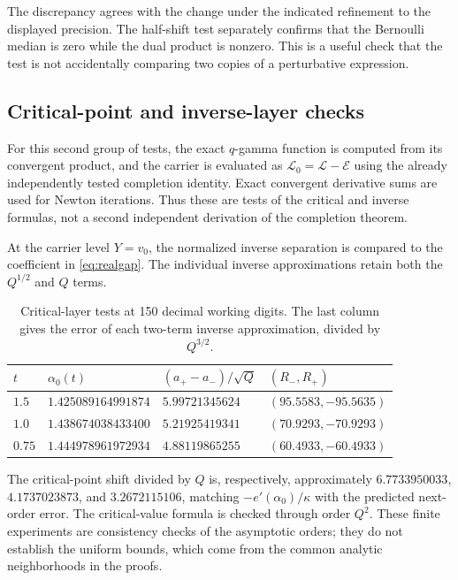 \documentclass[11pt,a4paper]{article}
\numberwithin{equation}{section}
\theoremstyle{definition}
\theoremstyle{remark}
\newcommand{\cL}{\mathcal L}
\newcommand{\cE}{\mathcal E}
\begin{document}
The discrepancy agrees with the change under the indicated refinement
to the displayed precision. The half-shift test separately confirms
that the Bernoulli median is zero while the dual product is nonzero.
This is a useful check that the test is not accidentally comparing two
copies of a perturbative expression.

\subsection{Critical-point and inverse-layer checks}
For this second group of tests, the exact $q$-gamma function is
computed from its convergent product, and the carrier is evaluated as
$\cL_0=\cL-\cE$ using the already independently tested completion
identity. Exact convergent derivative sums are used for Newton
iterations. Thus these are tests of the critical and inverse formulas,
not a second independent derivation of the completion theorem.

At the carrier level $Y=v_0$, the normalized inverse separation is
compared to the coefficient in \eqref{eq:realgap}. The individual
inverse approximations retain both the $Q^{1/2}$ and $Q$ terms.

\begin{table}[htbp]
\centering
\caption{Critical-layer tests at 150 decimal working digits.
The last column gives the error of each two-term inverse approximation, divided by $Q^{3/2}$.}
\label{tab:fold}
\begin{tabular}{@{}llll@{}}
\toprule
$t$ & $\alpha_0(t)$ & $(a_+-a_-)/\sqrt Q$ & $(R_-,R_+)$\\
\midrule
$1.5$ & $1.425089164991874$ & $5.99721345624$ & $(95.5583,-95.5635)$\\
$1.0$ & $1.438674038433400$ & $5.21925419341$ & $(70.9293,-70.9293)$\\
$0.75$ & $1.444978961972934$ & $4.88119865255$ & $(60.4933,-60.4933)$\\
\bottomrule
\end{tabular}
\end{table}

The critical-point shift divided by $Q$ is, respectively,
approximately $6.7733950033$, $4.1737023873$, and $3.2672115106$,
matching $-e'(\alpha_0)/\kappa$ with the predicted next-order error.
The critical-value formula is checked through order $Q^2$. These
finite experiments are consistency checks of the asymptotic orders;
they do not establish the uniform bounds, which come from the common
analytic neighborhoods in the proofs.
\end{document}
